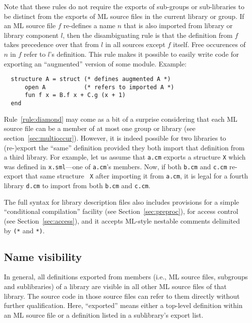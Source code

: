 \documentclass[titlepage,letterpaper]{article}
\begin{document}
Note that these rules do not require the exports of sub-groups or
sub-libraries to be distinct from the exports of ML source files in
the current library or group.  If an ML source file $f$ re-defines a
name $n$ that is also imported from library or library component $l$,
then the disambiguating rule is that the definition from $f$ takes
precedence over that from $l$ in all sources except $f$ itself.  Free
occurences of $n$ in $f$ refer to $l$'s definition.  This rule makes
it possible to easily write code for exporting an ``augmented''
version of some module.  Example:

\begin{verbatim}
  structure A = struct (* defines augmented A *)
      open A           (* refers to imported A *)
      fun f x = B.f x + C.g (x + 1)
  end
\end{verbatim}

Rule~\ref{rule:diamond} may come as a bit of a surprise considering
that each ML source file can be a member of at most one group or
library (see section~\ref{sec:multioccur}).  However, it is indeed
possible for two libraries to (re-)export the ``same'' definition
provided they both import that definition from a third library.  For
example, let us assume that {\tt a.cm} exports a structure {\tt X}
which was defined in {\tt x.sml}---one of {\tt a.cm}'s members.  Now,
if both {\tt b.cm} and {\tt c.cm} re-export that same structure {\tt
X} after importing it from {\tt a.cm}, it is legal for a fourth
library {\tt d.cm} to import from both {\tt b.cm} and {\tt c.cm}.

The full syntax for library description files also includes provisions
for a simple ``conditional compilation'' facility (see
Section~\ref{sec:preproc}), for access control (see
Section~\ref{sec:access}), and it accepts ML-style nestable comments
delimited by \verb|(*| and \verb|*)|.

\subsection{Name visibility}

In general, all definitions exported from members (i.e., ML source
files, subgroups and sublibraries) of a library are visible in all
other ML source files of that library.  The source code in those
source files can refer to them directly without further qualification.
Here, ``exported'' means either a top-level definition within an ML
source file or a definition listed in a sublibrary's export list.
\end{document}
